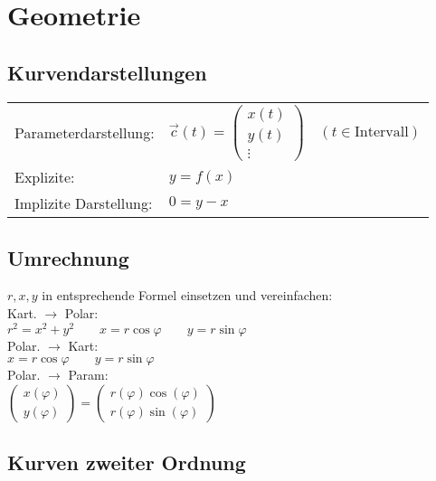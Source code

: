 \section{Geometrie}
\subsection{Kurvendarstellungen }
\begin{tabular}{ l l }
	Parameterdarstellung: & $\vec{c}(t) = \begin{pmatrix}
		x(t) \\
		y(t) \\
		\vdots
	\end{pmatrix} \quad (t \in \text{Intervall})$\\
	Explizite: & $y = f(x)$\\
	Implizite Darstellung: & $0 = y - x$    
\end{tabular}

\subsection{Umrechnung}
$r, x, y$ in entsprechende Formel einsetzen und vereinfachen:\\

\noindent Kart. $\rightarrow$ Polar: \\
$r^2 = x^2 + y^2 \qquad x = r\cos\varphi \qquad y = r\sin\varphi$\\

\noindent Polar. $\rightarrow$ Kart: \\
$x = r\cos\varphi \qquad y = r\sin\varphi$\\


\noindent Polar. $\rightarrow$ Param: \\
$\begin{pmatrix}
	x(\varphi) \\ y(\varphi)
\end{pmatrix} 
=
\begin{pmatrix}
	r(\varphi)\cos(\varphi) \\ r(\varphi)\sin(\varphi)
\end{pmatrix}$\\

\subsection{Kurven zweiter Ordnung }

